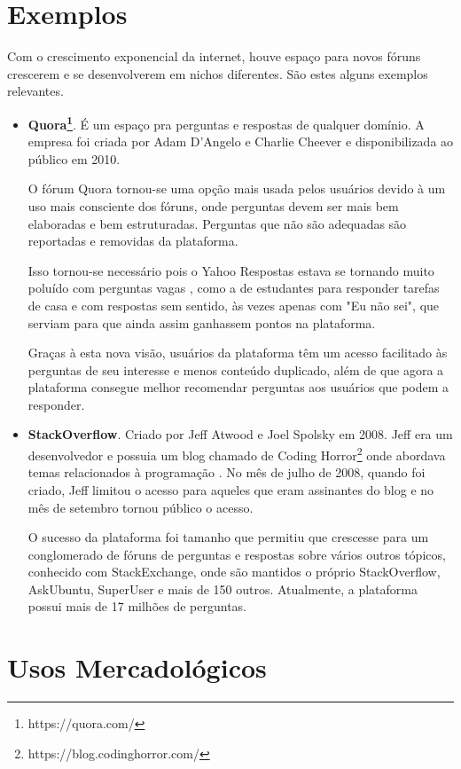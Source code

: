 \section{Exemplos}
Com o crescimento exponencial da internet, houve espaço para novos fóruns crescerem e se desenvolverem em nichos diferentes. São estes alguns exemplos relevantes.
\begin{itemize}
    \item \textbf{Quora\footnote{https://quora.com/}}. É um espaço pra perguntas e respostas de qualquer domínio. A empresa foi criada por Adam D'Angelo e Charlie Cheever e disponibilizada ao público em 2010.

    O fórum Quora tornou-se uma opção mais usada pelos usuários devido à um uso mais consciente dos fóruns, onde perguntas devem ser mais bem elaboradas e bem estruturadas. Perguntas que não são adequadas são reportadas e removidas da plataforma.
    
    Isso tornou-se necessário pois o Yahoo Respostas estava se tornando muito poluído com perguntas vagas \cite{quoravsyahoo}, como a de estudantes para responder tarefas de casa e com respostas sem sentido, às vezes apenas com "Eu não sei", que serviam para que ainda assim ganhassem pontos na plataforma.
    
    Graças à esta nova visão, usuários da plataforma têm um acesso facilitado às perguntas de seu interesse e menos conteúdo duplicado, além de que agora a plataforma consegue melhor recomendar perguntas aos usuários que podem a responder.
    
    \item \textbf{StackOverflow}.
    Criado por Jeff Atwood e Joel Spolsky em 2008. Jeff era um desenvolvedor e possuia um blog chamado de Coding Horror\footnote{https://blog.codinghorror.com/} onde abordava temas relacionados à programação \cite{codinghorror}. No mês de julho de 2008, quando foi criado, Jeff limitou o acesso para aqueles que eram assinantes do blog e no mês de setembro tornou público o acesso.
    
    O sucesso da plataforma foi tamanho que permitiu que crescesse para um conglomerado de fóruns de perguntas e respostas sobre vários outros tópicos, conhecido com StackExchange, onde são mantidos o próprio StackOverflow, AskUbuntu, SuperUser e mais de 150 outros. Atualmente, a plataforma possui mais de 17 milhões de perguntas.
\end{itemize}
\section{Usos Mercadológicos}

